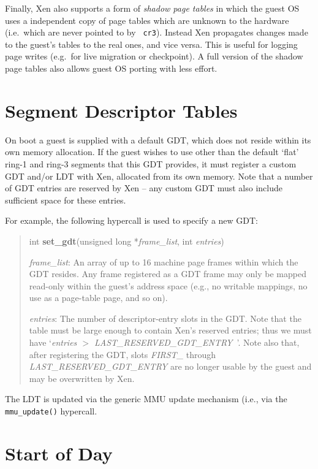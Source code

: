 \documentclass[11pt,twoside,final,openright]{report}
\begin{document}
Finally, Xen also supports a form of \emph{shadow page tables} in
which the guest OS uses a independent copy of page tables which are
unknown to the hardware (i.e.\ which are never pointed to by {\tt
cr3}). Instead Xen propagates changes made to the guest's tables to the
real ones, and vice versa. This is useful for logging page writes
(e.g.\ for live migration or checkpoint). A full version of the shadow
page tables also allows guest OS porting with less effort.

\section{Segment Descriptor Tables}

On boot a guest is supplied with a default GDT, which does not reside
within its own memory allocation.  If the guest wishes to use other
than the default `flat' ring-1 and ring-3 segments that this GDT
provides, it must register a custom GDT and/or LDT with Xen,
allocated from its own memory. Note that a number of GDT 
entries are reserved by Xen -- any custom GDT must also include
sufficient space for these entries. 

For example, the following hypercall is used to specify a new GDT: 

\begin{quote}
int {\bf set\_gdt}(unsigned long *{\em frame\_list}, int {\em entries})

{\em frame\_list}: An array of up to 16 machine page frames within
which the GDT resides.  Any frame registered as a GDT frame may only
be mapped read-only within the guest's address space (e.g., no
writable mappings, no use as a page-table page, and so on).

{\em entries}: The number of descriptor-entry slots in the GDT.  Note
that the table must be large enough to contain Xen's reserved entries;
thus we must have `{\em entries $>$ LAST\_RESERVED\_GDT\_ENTRY}\ '.
Note also that, after registering the GDT, slots {\em FIRST\_} through
{\em LAST\_RESERVED\_GDT\_ENTRY} are no longer usable by the guest and
may be overwritten by Xen.
\end{quote}

The LDT is updated via the generic MMU update mechanism (i.e., via 
the {\tt mmu\_update()} hypercall. 

\section{Start of Day} 
\end{document}
